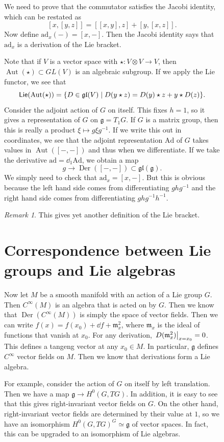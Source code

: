 \documentclass[leqno, openany]{memoir}
\theoremstyle{definition}
\theoremstyle{remark}
\newtheorem{rmk}[thm]{Remark}
\theoremstyle{plain}
\theoremstyle{definition}
\theoremstyle{remark}
\newcommand{\mf}[1]{\mathfrak{#1}}
\newcommand{\mr}[1]{\mathrm{#1}}
\DeclareMathOperator{\Der}{Der}
\DeclareMathOperator{\Aut}{Aut}
\DeclareMathOperator{\Lie}{\mathsf{Lie}}
\begin{document}
\begin{figure}[H]
We need to prove that the commutator satisfies the Jacobi identity, which can
be restated as \[ [x, [y,z]] = [[x,y],z] + [y, [x,z]]. \] Now define
$\mr{ad}_x(-) = [x,-]$. Then the Jacobi identity says that $\mr{ad}_x$ is a
derivation of the Lie bracket.

Note that if $V$ is a vector space with $\star \colon V \otimes V \to V$, then
$\Aut(\star) \subset GL(V)$ is an algebraic subgroup. If we apply the Lie
functor, we see that \[ \Lie ( \Aut(\star) ) = \qty{ D \in \mf{gl}(V) \mid D(y
\star z) = D(y) \star z + y \star D(z) }. \] Consider the adjoint action of $G$
on itself. This fixes $h = 1$, so it gives a representation of $G$ on $\mf{g} =
T_1 G$. If $G$ is a matrix group, then this is really a product $\xi \mapsto g
\xi g^{-1}$. If we write this out in coordinates, we see that the adjoint
representation $\mr{Ad}$ of $G$ takes values in $\Aut([-,-])$ and thus when we
differentiate. If we take the derivative $\mr{ad} = \dd_1 \mr{Ad}$, we obtain a
map \[ g \to \Der([-,-]) \subset \mf{gl}(\mf{g}). \] We simply need to check
that $\mr{ad}_x = [x,-]$. But this is obvious because the left hand side comes
from differentiating $ghg^{-1}$ and the right hand side comes from
differentiating $ghg^{-1}h^{-1}$.

\begin{rmk} This gives yet another definition of the Lie bracket.  \end{rmk}

\section{Correspondence between Lie groups and Lie algebras}%
\label{sec:correspondence_between_lie_groups_and_lie_algebras}

Now let $M$ be a smooth manifold with an action of a Lie group $G$. Then
$C^{\infty}(M)$ is an algebra that is acted on by $G$. Then we know that
$\Der(C^{\infty}(M))$ is simply the space of vector fields. Then we can write
$f(x) = f(x_0) + \dd f + \mf{m}_x^2$, where $\mf{m}_x$ is the ideal of
functions that vanish at $x_0$. For any derivation, $\eval{ D(\mf{m}_x^2)  }_{x
= x_0} = 0$. This defines a tangeng vector at any $x_0 \in M$. In particular,
$\mf{g}$ defines $C^{\infty}$ vector fields on $M$. Then we know that
derivations form a Lie algebra.

For example, consider the action of $G$ on itself by left translation. Then we
have a map $\mf{g} \to H^0(G, TG)$. In addition, it is easy to see that this
gives right-invariant vector fields on $G$. On the other hand, right-invariant
vector fields are determined by their value at $1$, so we have an isomorphism
$H^0(G, TG)^G \simeq \mf{g}$ of vector spaces. In fact, this can be upgraded to
an isomorphism of Lie algebras.


\end{figure}
\end{document}
